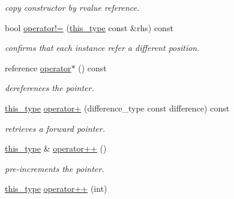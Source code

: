 \begin{DoxyCompactItemize}
\begin{DoxyCompactList}\small\item\em copy constructor by rvalue reference. \end{DoxyCompactList}\item 
\hypertarget{classhryky_1_1_offset_ptr_a0f0dced452b4559cba2d4e8e5e0d30df}{bool \hyperlink{classhryky_1_1_offset_ptr_a0f0dced452b4559cba2d4e8e5e0d30df}{operator!=} (\hyperlink{classhryky_1_1_offset_ptr_a73a85221d5352162be046159f4aea008}{this\-\_\-type} const \&rhs) const }\label{classhryky_1_1_offset_ptr_a0f0dced452b4559cba2d4e8e5e0d30df}

\begin{DoxyCompactList}\small\item\em confirms that each instance refer a different position. \end{DoxyCompactList}\item 
\hypertarget{classhryky_1_1_offset_ptr_aa5d3baf87f43bdda50d53b385aad65d9}{reference \hyperlink{classhryky_1_1_offset_ptr_aa5d3baf87f43bdda50d53b385aad65d9}{operator$\ast$} () const }\label{classhryky_1_1_offset_ptr_aa5d3baf87f43bdda50d53b385aad65d9}

\begin{DoxyCompactList}\small\item\em dereferences the pointer. \end{DoxyCompactList}\item 
\hypertarget{classhryky_1_1_offset_ptr_a67e7ff2f192f7762ef68cd0cc19f8bf6}{\hyperlink{classhryky_1_1_offset_ptr_a73a85221d5352162be046159f4aea008}{this\-\_\-type} \hyperlink{classhryky_1_1_offset_ptr_a67e7ff2f192f7762ef68cd0cc19f8bf6}{operator+} (difference\-\_\-type const difference) const }\label{classhryky_1_1_offset_ptr_a67e7ff2f192f7762ef68cd0cc19f8bf6}

\begin{DoxyCompactList}\small\item\em retrieves a forward pointer. \end{DoxyCompactList}\item 
\hypertarget{classhryky_1_1_offset_ptr_ad3475f4a72159db0ff120de8699920ca}{\hyperlink{classhryky_1_1_offset_ptr_a73a85221d5352162be046159f4aea008}{this\-\_\-type} \& \hyperlink{classhryky_1_1_offset_ptr_ad3475f4a72159db0ff120de8699920ca}{operator++} ()}\label{classhryky_1_1_offset_ptr_ad3475f4a72159db0ff120de8699920ca}

\begin{DoxyCompactList}\small\item\em pre-\/increments the pointer. \end{DoxyCompactList}\item 
\hypertarget{classhryky_1_1_offset_ptr_a3247e6d6b79211c93e1ab9d38c4ee3df}{\hyperlink{classhryky_1_1_offset_ptr_a73a85221d5352162be046159f4aea008}{this\-\_\-type} \hyperlink{classhryky_1_1_offset_ptr_a3247e6d6b79211c93e1ab9d38c4ee3df}{operator++} (int)}\label{classhryky_1_1_offset_ptr_a3247e6d6b79211c93e1ab9d38c4ee3df}


\end{DoxyCompactItemize}
